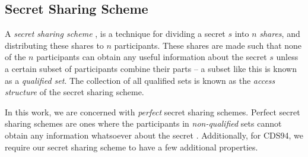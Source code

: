\subsection{Secret Sharing Scheme}
A \textit{secret sharing scheme} \cite{DBLP:journals/cacm/Shamir79, DBLP:conf/mark2/Blakley79}, is a technique for dividing a secret $s$ into $n$ \textit{shares}, and distributing these shares to $n$ participants. These shares are made such that none of the $n$ participants can obtain any useful information about the secret $s$ unless a certain subset of participants combine their parts -- a subset like this is known as a \textit{qualified set}. The collection of all qualified sets is known as the \textit{access structure} of the secret sharing scheme. 

In this work, we are concerned with \textit{perfect} secret sharing schemes. 
Perfect secret sharing schemes are ones where the participants in \textit{non-qualified} sets cannot obtain any information 
whatsoever about the secret \cite{CDS94}. Additionally, for CDS94, we require our secret sharing scheme to have a few 
additional properties. 

